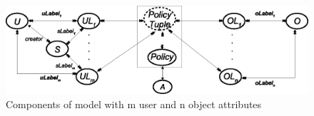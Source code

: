  
 	\begin{figure} 
 		\centering
 		\includegraphics[width=.9\textwidth]{DBSEC16/epabac-mn}
 		\caption{Components of \EPModels{} model with m user and n object attributes}
 		\label{fig:epabac-mn}
 	\end{figure}
 